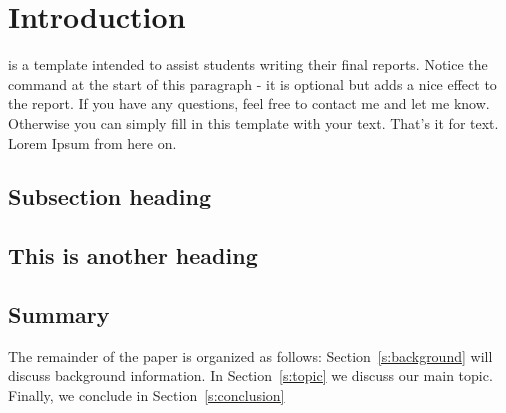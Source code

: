 \section{Introduction}
\label{s:intro} %

 is a template intended to assist students writing their final reports.
Notice the command at the start of this paragraph - it is optional but adds a nice effect to the report.
If you have any questions, feel free to contact me and let me know.
Otherwise you can simply fill in this template with your text.
That's it for text.  Lorem Ipsum from here on.

\subsection{Subsection heading}
\lipsum[1] %

\subsection{This is another heading}
\lipsum[2-3]

\subsection{Summary}
The remainder of the paper is organized as follows:
Section~\ref{s:background} will discuss background information.
In Section~\ref{s:topic} we discuss our main topic.
Finally, we conclude in Section~\ref{s:conclusion}
